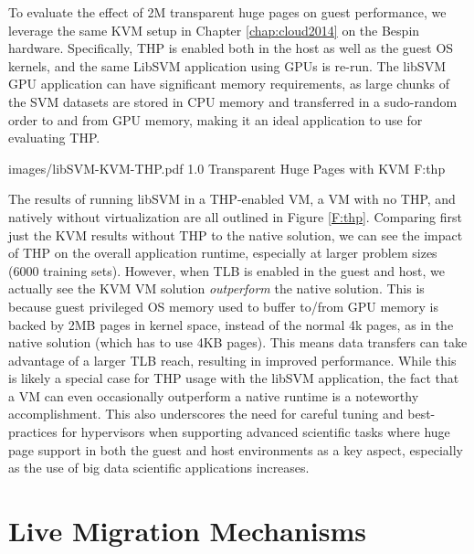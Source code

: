 To evaluate the effect of 2M transparent huge pages on guest performance, we leverage the same KVM setup in Chapter \ref{chap:cloud2014} on the Bespin hardware. Specifically, THP is enabled both in the host as well as the guest OS kernels, and the same LibSVM application using GPUs is re-run. The libSVM GPU application can have significant memory requirements, as large chunks of the SVM datasets are stored in CPU memory and transferred in a sudo-random order to and from GPU memory, making it an ideal application to use for evaluating THP.



  {images/libSVM-KVM-THP.pdf}
  {1.0}
  {Transparent Huge Pages with KVM}
  {F:thp}


The results of running libSVM in a THP-enabled VM, a VM with no THP, and natively without virtualization are all outlined in Figure \ref{F:thp}.  Comparing first just the KVM results without THP to the native solution, we can see the impact of THP on the overall application runtime, especially at larger problem sizes (6000 training sets). However, when TLB is enabled in the guest and host, we actually see the KVM VM solution \emph{outperform} the native solution. This is because guest privileged OS memory used to buffer to/from GPU memory is backed by 2MB pages in kernel space, instead of the normal 4k pages, as in the native solution (which has to use 4KB pages). This means data transfers can take advantage of a larger TLB reach, resulting in improved performance.  While this is likely a special case for THP usage with the libSVM application, the fact that a VM can even occasionally outperform a native runtime is a noteworthy accomplishment. This also underscores the need for careful tuning and best-practices for hypervisors when supporting advanced scientific tasks where huge page support in both the guest and host environments as a key aspect, especially as the use of big data scientific applications increases.  

\section{Live Migration Mechanisms}


